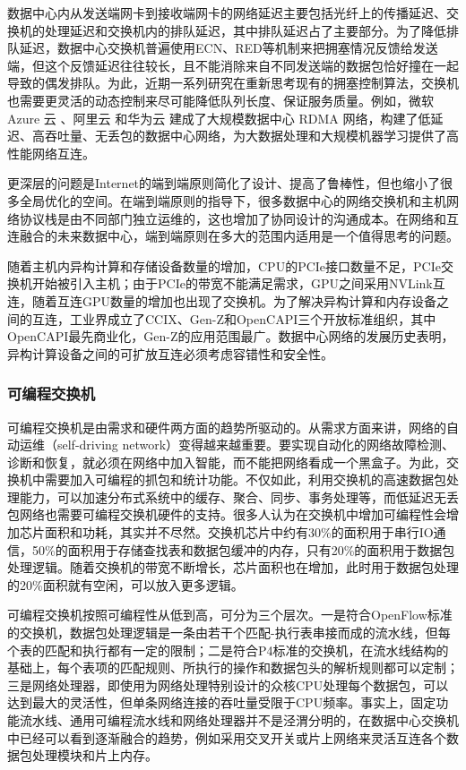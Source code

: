 数据中心内从发送端网卡到接收端网卡的网络延迟主要包括光纤上的传播延迟、交换机的处理延迟和交换机内的排队延迟，其中排队延迟占了主要部分。为了降低排队延迟，数据中心交换机普遍使用ECN、RED等机制来把拥塞情况反馈给发送端，但这个反馈延迟往往较长，且不能消除来自不同发送端的数据包恰好撞在一起导致的偶发排队。为此，近期一系列研究在重新思考现有的拥塞控制算法，交换机也需要更灵活的动态控制来尽可能降低队列长度、保证服务质量。例如，微软 Azure 云 \cite{guo2016rdma}、阿里云 \cite{aliyun-rdma} 和华为云 \cite{huawei-lossless} 建成了大规模数据中心 RDMA 网络，构建了低延迟、高吞吐量、无丢包的数据中心网络，为大数据处理和大规模机器学习提供了高性能网络互连。

更深层的问题是Internet的端到端原则简化了设计、提高了鲁棒性，但也缩小了很多全局优化的空间。在端到端原则的指导下，很多数据中心的网络交换机和主机网络协议栈是由不同部门独立运维的，这也增加了协同设计的沟通成本。在网络和互连融合的未来数据中心，端到端原则在多大的范围内适用是一个值得思考的问题。

随着主机内异构计算和存储设备数量的增加，CPU的PCIe接口数量不足，PCIe交换机开始被引入主机；由于PCIe的带宽不能满足需求，GPU之间采用NVLink互连，随着互连GPU数量的增加也出现了交换机。为了解决异构计算和内存设备之间的互连，工业界成立了CCIX、Gen-Z和OpenCAPI三个开放标准组织，其中OpenCAPI最先商业化，Gen-Z的应用范围最广。数据中心网络的发展历史表明，异构计算设备之间的可扩放互连必须考虑容错性和安全性。

\subsubsection{可编程交换机}

可编程交换机是由需求和硬件两方面的趋势所驱动的。从需求方面来讲，网络的自动运维（self-driving network）变得越来越重要。要实现自动化的网络故障检测、诊断和恢复，就必须在网络中加入智能，而不能把网络看成一个黑盒子。为此，交换机中需要加入可编程的抓包和统计功能。不仅如此，利用交换机的高速数据包处理能力，可以加速分布式系统中的缓存、聚合、同步、事务处理等，而低延迟无丢包网络也需要可编程交换机硬件的支持。很多人认为在交换机中增加可编程性会增加芯片面积和功耗，其实并不尽然。交换机芯片中约有30\%的面积用于串行IO通信，50\%的面积用于存储查找表和数据包缓冲的内存，只有20\%的面积用于数据包处理逻辑。随着交换机的带宽不断增长，芯片面积也在增加，此时用于数据包处理的20\%面积就有空闲，可以放入更多逻辑。

可编程交换机按照可编程性从低到高，可分为三个层次。一是符合OpenFlow标准的交换机，数据包处理逻辑是一条由若干个匹配-执行表串接而成的流水线，但每个表的匹配和执行都有一定的限制；二是符合P4标准的交换机，在流水线结构的基础上，每个表项的匹配规则、所执行的操作和数据包头的解析规则都可以定制；三是网络处理器，即使用为网络处理特别设计的众核CPU处理每个数据包，可以达到最大的灵活性，但单条网络连接的吞吐量受限于CPU频率。事实上，固定功能流水线、通用可编程流水线和网络处理器并不是泾渭分明的，在数据中心交换机中已经可以看到逐渐融合的趋势，例如采用交叉开关或片上网络来灵活互连各个数据包处理模块和片上内存。

